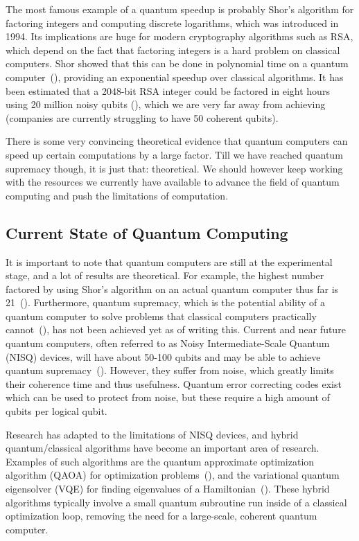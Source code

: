 \documentclass[a4paper,10pt]{article}
\begin{document}
The most famous example of a quantum speedup is probably Shor's algorithm for factoring integers and computing discrete logarithms, which was introduced in 1994.
Its implications are huge for modern cryptography algorithms such as RSA, which depend on the fact that factoring integers is a hard problem on classical computers.
Shor showed that this can be done in polynomial time on a quantum computer~(\cite{shor-factoring}), providing an exponential speedup over classical algorithms. 
It has been estimated that a 2048-bit RSA integer could be factored in eight hours using 20 million noisy qubits (\cite{shor-20mil}), which we are very far away from achieving (companies are currently struggling to have 50 coherent qubits).

There is some very convincing theoretical evidence that quantum computers can speed up certain computations by a large factor.
Till we have reached quantum supremacy though, it is just that: theoretical.
We should however keep working with the resources we currently have available to advance the field of quantum computing and push the limitations of computation.

\subsection{Current State of Quantum Computing}
It is important to note that quantum computers are still at the experimental stage, and a lot of results are theoretical.
For example, the highest number factored by using Shor's algorithm on an actual quantum computer thus far is 21~(\cite{shor-21}).
Furthermore, quantum supremacy, which is the potential ability of a quantum computer to solve problems that classical computers practically cannot~(\cite{preskill-qc}), has not been achieved yet as of writing this.
Current and near future quantum computers, often referred to as Noisy Intermediate-Scale Quantum (NISQ) devices, will have about 50-100 qubits and may be able to achieve quantum supremacy~(\cite{preskill-nisq}).
However, they suffer from noise, which greatly limits their coherence time and thus usefulness.
Quantum error correcting codes exist which can be used to protect from noise, but these require a high amount of qubits per logical qubit.

Research has adapted to the limitations of NISQ devices, and hybrid quantum/classical algorithms have become an important area of research.
Examples of such algorithms are the quantum approximate optimization algorithm (QAOA) for optimization problems~(\cite{qaoa}), and the variational quantum eigensolver (VQE) for finding eigenvalues of a Hamiltonian~(\cite{vqe}).
These hybrid algorithms typically involve a small quantum subroutine run inside of a classical optimization loop, removing the need for a large-scale, coherent quantum computer.
\end{document}
